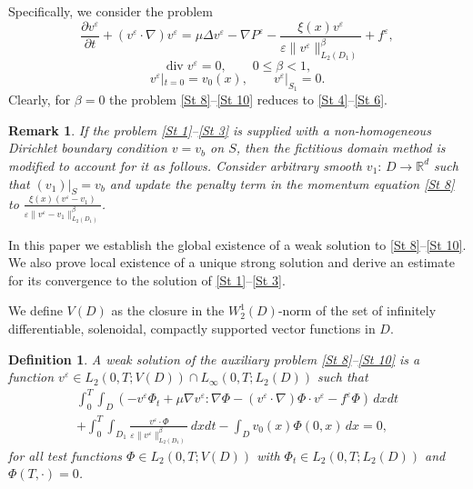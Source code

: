 \documentclass[11pt]{article}
\newtheorem{definition}{Definition}[section]
\newtheorem{remark}{Remark}
\begin{document}
Specifically, we consider the problem
\begin{equation} \label{St 8}
	\frac{\partial v^\varepsilon}{\partial t} + (v^\varepsilon \cdot \nabla)v^\varepsilon = \mu\Delta v^\varepsilon - \nabla P^\varepsilon - \frac{\xi(x)v^\varepsilon}{\varepsilon\|v^\varepsilon\|_{L_2(D_1)}^{\beta}} + f^{\varepsilon},
\end{equation}
\begin{equation} \label{St 9}
	\operatorname{div} v^\varepsilon = 0, \qquad 0 \le \beta < 1,
\end{equation}
\begin{equation} \label{St 10}
	v^\varepsilon|_{t=0} = v_0(x),\qquad v^\varepsilon|_{S_1} = 0.
\end{equation}
Clearly, for $\beta = 0$ the problem \eqref{St 8}--\eqref{St 10} reduces to \eqref{St 4}--\eqref{St 6}. 

\begin{remark}{
	If the problem \eqref{St 1}--\eqref{St 3} is supplied with a non-homogeneous Dirichlet boundary condition  $v=v_b$ on $S$, then the fictitious domain method is modified to account for it as follows. Consider arbitrary smooth $v_1:\,D\to \mathbb{R}^d$ such that $(v_1)|_{S}=v_b$ and update the penalty term in the momentum equation \eqref{St 8} to $\frac{\xi(x)(v^\varepsilon-v_1)}{\varepsilon\|v^\varepsilon-v_1\|_{L_2(D_1)}^{\beta}}$.}
\end{remark}


In this paper we establish the global existence of a weak solution to \eqref{St 8}--\eqref{St 10}. We also prove local existence of a unique strong solution and derive an estimate for its convergence to the solution of \eqref{St 1}--\eqref{St 3}. 


We define $V(D)$ as the closure in the $W_{2}^{1}(D)$-norm of the set of infinitely differentiable, solenoidal, compactly supported vector functions in $D$. 

\begin{definition}
	A weak solution of the auxiliary problem \eqref{St 8}--\eqref{St 10} is a function $v^\varepsilon \in L_2(0,T;V(D)) \cap L_\infty(0,T;L_2(D))$ such that
	\begin{multline*}
	\int_0^T \int_D \left( -v^\varepsilon \Phi_t + \mu \nabla v^\varepsilon: \nabla\Phi - (v^\varepsilon \cdot \nabla)\Phi \cdot v^\varepsilon - f^\varepsilon \Phi \right) \, dx dt\\
	+ \int_0^T \int_{D_1} \frac{v^\varepsilon \cdot \Phi}{\varepsilon \|v^\varepsilon\|_{L_2(D_1)}^\beta} \, dx dt - \int_D v_0(x)\Phi(0,x)\,dx = 0,
	\end{multline*}
	for all  test functions $\Phi \in L_2(0,T;V(D))$ with $\Phi_t \in L_2(0,T;L_2(D))$ and $\Phi(T,\cdot)=0$.
\end{definition}
\end{document}
